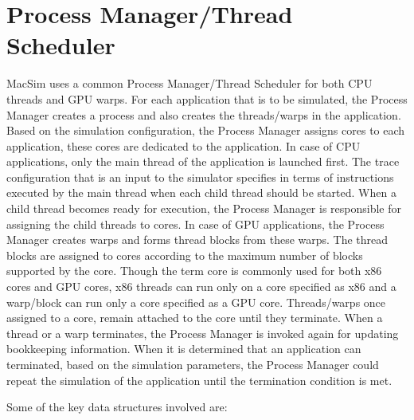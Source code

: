 \chapter{Process Manager/Thread Scheduler}
\label{sec:process_manager}

MacSim uses a common Process Manager/Thread Scheduler for both CPU threads and
GPU warps. For each application that is to be simulated, the Process Manager
creates a process and also creates the threads/warps in the application. Based
on the simulation configuration, the Process Manager assigns cores to each
application, these cores are dedicated to the application. In case of CPU
applications, only the main thread of the application is launched first. The
trace configuration that is an input to the simulator specifies in terms of instructions
executed by the main thread when each child thread should be started. When a
child thread becomes ready for execution, the Process Manager is responsible
for assigning the child threads to cores. In case of GPU applications, the
Process Manager creates warps and forms thread blocks from these warps. The
thread blocks are assigned to cores according to the maximum number of blocks
supported by the core. Though the term core is commonly used for both x86 cores
and GPU cores, x86 threads can run only on a core
specified as x86 and a warp/block can run only a core specified as a GPU core.
Threads/warps once assigned to a core, remain attached to the core until they
terminate. When a thread or a warp terminates, the Process Manager is invoked
again for updating bookkeeping information. When it is determined that an
application can terminated, based on the simulation parameters, the Process
Manager could repeat the simulation of the application until the termination
condition is met.

Some of the key data structures involved are:

